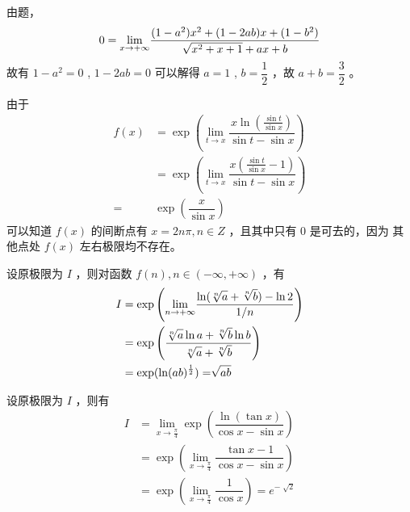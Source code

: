 \begin{Answer}
    由题，
    $$
       0 =  {\displaystyle\lim_{x\rightarrow +\infty}} 
       \displaystyle\frac{(1-a^2)x^2+(1-2ab)x+(1-b^2)}{\sqrt{x^2+x+1}+ax+b}
    $$ 
    故有 $ 1-a^2 = 0 $ , $ 1-2ab = 0 $ 
    可以解得 $ a=1 $ , $ b = \dfrac{1}{2} $ ，故 $ a+b=\dfrac{3}{2} $ 。
\end{Answer}

\begin{Answer}
    由于
    \begin{equation*}
        \begin{aligned}
            f(x) &= \exp \left({\displaystyle\lim_{t\rightarrow x}}
            \dfrac{x\ln(\frac{\sin t}{\sin x})}{\sin t-\sin x}\right)\\ 
            &= \exp \left(\lim_{t\rightarrow x}\dfrac{x(\frac{\sin t}{\sin x}-1)}{\sin t-\sin x}\right)\\ 
            =& \exp(\dfrac{x}{\sin x})
        \end{aligned}
    \end{equation*}
    可以知道 $ f(x) $ 的间断点有 $ x = 2n\pi, n\in Z $ ，且其中只有 $ 0 $ 是可去的，因为
    其他点处 $ f(x) $ 左右极限均不存在。
\end{Answer}

\begin{Answer}[不要认为令 $ a = b = 1 $ 的结果一定能代表答案\getback{T4}]
    设原极限为 $ I $ ，则对函数 $ f(n),n\in (-\infty,+\infty) $ ，有
    \begin{equation*}
        \begin{aligned}
            I &= \exp \left({\displaystyle\lim_{n\rightarrow +\infty}}
            \dfrac{\ln(\displaystyle\sqrt[n]{a}+\displaystyle\sqrt[n]{b})-\ln 2}{1/n} \right)\\ &=
            \exp\left(\dfrac{\displaystyle\sqrt[n]{a}\ln a+\displaystyle\sqrt[n]{b}\ln b}{\displaystyle\sqrt[n]{a}+\displaystyle\sqrt[n]{b}}\right)
            \\&= \exp(\ln (ab)^\frac{1}{2}) = \displaystyle\sqrt[]{ab}
        \end{aligned}
    \end{equation*}
\end{Answer}

\begin{Answer}
    设原极限为 $ I $ ，则有
    \begin{equation*}
        \begin{aligned}
            I &= {\displaystyle\lim_{x\rightarrow \frac{\pi}{4}}}\exp\left(\dfrac{\ln (\tan x)}
            {\cos x - \sin x}\right) \\&= \exp\left({\displaystyle\lim_{x\rightarrow \frac{\pi}{4}}}
            \dfrac{\tan x - 1}{\cos x - \sin x}\right) \\&=
            \exp({\displaystyle\lim_{x\rightarrow \frac{\pi}{4}}} \dfrac{1}{\cos x}) = e^{-\sqrt[]{2}}
        \end{aligned}
    \end{equation*}
\end{Answer}

